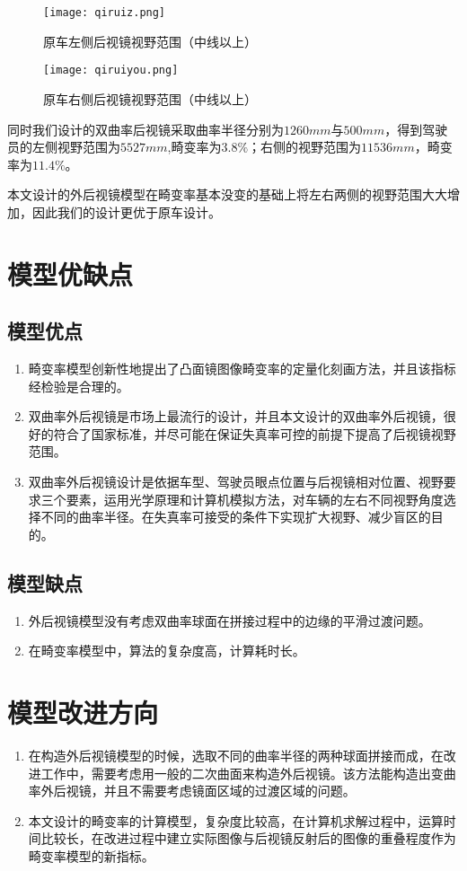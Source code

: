 \documentclass[withoutpreface,bwprint]{cumcmthesis} %
\begin{document}
\begin{figure}[!htpb]
\small
\centering
\texttt{[image: qiruiz.png]}
\caption{原车左侧后视镜视野范围（中线以上）} \label{fig:qiruiz}
\end{figure}

\begin{figure}[!htpb]
\small
\centering
\texttt{[image: qiruiyou.png]}
\caption{原车右侧后视镜视野范围（中线以上）} \label{fig:qiruiy}
\end{figure}

\par 同时我们设计的双曲率后视镜采取曲率半径分别为$1260mm$与$500mm$，得到驾驶员的左侧视野范围为$5527mm$,畸变率为$3.8\%$；右侧的视野范围为$11536 mm$，畸变率为$11.4\%$。

\par 本文设计的外后视镜模型在畸变率基本没变的基础上将左右两侧的视野范围大大增加，因此我们的设计更优于原车设计。


\section{模型优缺点}
\subsection{模型优点}
\begin{enumerate}
	\item 畸变率模型创新性地提出了凸面镜图像畸变率的定量化刻画方法，并且该指标经检验是合理的。
	\item 双曲率外后视镜是市场上最流行的设计，并且本文设计的双曲率外后视镜，很好的符合了国家标准，并尽可能在保证失真率可控的前提下提高了后视镜视野范围。
	\item 双曲率外后视镜设计是依据车型、驾驶员眼点位置与后视镜相对位置、视野要求三个要素，运用光学原理和计算机模拟方法，对车辆的左右不同视野角度选择不同的曲率半径。在失真率可接受的条件下实现扩大视野、减少盲区的目的。
\end{enumerate}
\subsection{模型缺点}
\begin{enumerate}
	\item 外后视镜模型没有考虑双曲率球面在拼接过程中的边缘的平滑过渡问题。
	\item 在畸变率模型中，算法的复杂度高，计算耗时长。
\end{enumerate}
\section{模型改进方向}
\begin{enumerate}
	\item 在构造外后视镜模型的时候，选取不同的曲率半径的两种球面拼接而成，在改进工作中，需要考虑用一般的二次曲面来构造外后视镜。该方法能构造出变曲率外后视镜，并且不需要考虑镜面区域的过渡区域的问题。
	\item 本文设计的畸变率的计算模型，复杂度比较高，在计算机求解过程中，运算时间比较长，在改进过程中建立实际图像与后视镜反射后的图像的重叠程度作为畸变率模型的新指标。
\end{enumerate}
\end{document}
